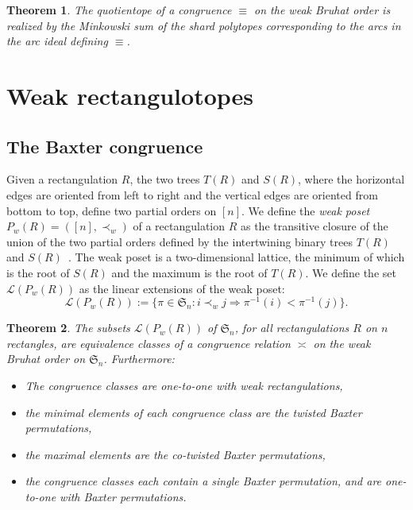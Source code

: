 \documentclass{amsart}
\newtheorem{theorem}{Theorem}%
\theoremstyle{definition}
\newcommand{\f}[1]{\mathfrak{#1}} %
\renewcommand{\implies}{\Rightarrow} %
\newcommand{\darkblue}{\color{darkblue}} %
\newcommand{\defn}[1]{\textsl{\darkblue #1}} %
\newcommand{\baxtereq}{\asymp}%
\begin{document}
\begin{theorem}
  The quotientope of a congruence $\equiv$ on the weak Bruhat order is realized by the Minkowski sum of the shard polytopes corresponding to the arcs in the arc ideal defining $\equiv$.
\end{theorem}


\section{Weak rectangulotopes}
\label{sec:wr}

\subsection{The Baxter congruence}


Given a rectangulation $R$, the two trees $T(R)$ and $S(R)$, where the horizontal edges are oriented from left to right and the vertical edges are oriented from bottom to top,
define two partial orders on $[n]$.
We define the \defn{weak poset} $P_w(R)=([n],\prec_w)$ of a rectangulation $R$ as the transitive closure of the union of the two partial orders defined by the intertwining binary trees $T(R)$ and $S(R)$~\cite{MR4014603}. The weak poset is a two-dimensional lattice, the minimum of which is the root of $S(R)$ and the maximum is the root of $T(R)$.
We define the set $\mathcal{L}(P_w(R))$ as the linear extensions of the weak poset:
\[
\mathcal{L}(P_w(R)) := \{\pi\in\f{S}_n : i\prec_w j\implies \pi^{-1}(i) < \pi^{-1}(j)\}.
\]

\begin{theorem}
  The subsets $\mathcal{L}(P_w(R))$ of $\f{S}_n$, for all rectangulations $R$ on $n$ rectangles, 
  are equivalence classes of a congruence relation $\baxtereq$ on the weak Bruhat order on $\f{S}_n$.
  Furthermore:
  \begin{itemize}
  \item The congruence classes are one-to-one with weak rectangulations,  
  \item the minimal elements of each congruence class are the twisted Baxter permutations,
  \item the maximal elements are the co-twisted Baxter permutations,
  \item the congruence classes each contain a single Baxter permutation, and are one-to-one with Baxter permutations.
  \end{itemize}
\end{theorem}
\end{document}
